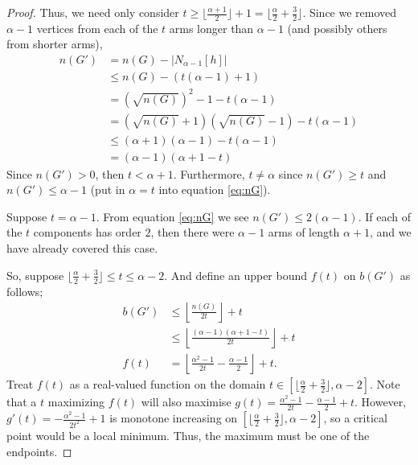 \documentclass[12pt]{article}
\begin{document}
\begin{proof}
    Thus, we need only consider $t \geq \lfloor \frac{\alpha + 1}{2} \rfloor + 1 = \lfloor \frac{\alpha}{2} + \frac{3}{2} \rfloor$. 
    Since we removed $\alpha - 1$ vertices from each of the $t$ arms longer than $\alpha - 1$ (and possibly others from shorter arms),
    \begin{align}
        n(G') &= n(G) - |N_{\alpha - 1}[h]| \nonumber \\
        &\leq n(G) - \left(t(\alpha - 1) + 1\right) \nonumber \\
        &= \left(\sqrt{n(G)}\right)^2 - 1 - t(\alpha - 1) \nonumber \\
        &= (\sqrt{n(G)} + 1)(\sqrt{n(G)} - 1) - t(\alpha - 1) \nonumber \\
        &\leq (\alpha + 1)(\alpha - 1) - t(\alpha - 1) \nonumber \\
        &= (\alpha - 1)(\alpha + 1 - t) \label{eq:nG}
    \end{align}
    Since $n(G') > 0$, then $t < \alpha + 1$.
    Furthermore, $t \neq \alpha$ since $n(G') \geq t$ and $n(G') \leq \alpha - 1$ (put in $\alpha = t$ into equation \ref{eq:nG}).

    Suppose $t = \alpha-1$.
    From equation \ref{eq:nG} we see $n(G') \leq 2(\alpha-1)$.
    If each of the $t$ components has order $2$, then there were $\alpha - 1$ arms of length $\alpha + 1$, and we have already covered this case.

    So, suppose $\lfloor \frac{\alpha}{2} + \frac{3}{2} \rfloor \leq t \leq \alpha - 2$.
    And define an upper bound $f(t)$ on $b(G')$ as follows;
    \begin{align}
        b(G') &\leq \left\lfloor \frac{n(G)}{2t} \right\rfloor + t \nonumber \\
        &\leq \left\lfloor \frac{(\alpha - 1)(\alpha + 1 - t)}{2t} \right\rfloor + t \nonumber\\
        f(t) &= \left\lfloor \frac{\alpha^2 - 1}{2t} - \frac{\alpha - 1}{2} \right\rfloor + t. \label{eq:bupper}
    \end{align}
    Treat $f(t)$ as a real-valued function on the domain $t \in [\lfloor \frac{\alpha}{2} + \frac{3}{2} \rfloor, \alpha - 2]$.
    Note that a $t$ maximizing $f(t)$ will also maximise $g(t) = \frac{\alpha^2 - 1}{2t} - \frac{\alpha - 1}{2} + t$.
    However, $g'(t) = -\frac{\alpha^2 - 1}{2t^2} + 1$ is monotone increasing on $[\lfloor \frac{\alpha}{2} + \frac{3}{2} \rfloor, \alpha - 2]$, so a critical point would be a local minimum.
    Thus, the maximum must be one of the endpoints.


\end{proof}
\end{document}
